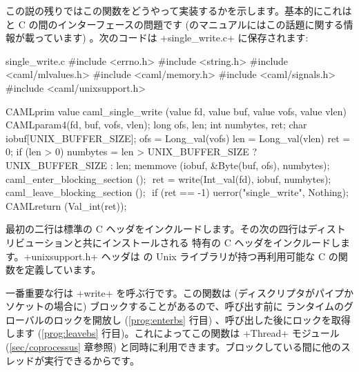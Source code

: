 この説の残りではこの関数をどうやって実装するかを示します。基本的にこれは \ocaml と C の間のインターフェースの問題です (\ocaml のマニュアルにはこの話題に関する情報が載っています) 。次のコードは \ml+single_write.c+ に保存されます:
%
\begin{listingcodefile}[style=numbers]{single_write.c}
#include <errno.h>
#include <string.h>
#include <caml/mlvalues.h>
#include <caml/memory.h>
#include <caml/signals.h>
#include <caml/unixsupport.h>

CAMLprim value caml_single_write
        (value fd, value buf, value vofs, value vlen) {
  CAMLparam4(fd, buf, vofs, vlen);
  long ofs, len;
  int numbytes, ret;
  char iobuf[UNIX_BUFFER_SIZE];
  ofs = Long_val(vofs)
  len = Long_val(vlen)
  ret = 0;
  if (len > 0) {
    numbytes = len > UNIX_BUFFER_SIZE ? UNIX_BUFFER_SIZE : len;
    memmove (iobuf, &Byte(buf, ofs), numbytes);
    caml_enter_blocking_section (); $\label{prog:enterbs}$
    ret = write(Int_val(fd), iobuf, numbytes);
    caml_leave_blocking_section (); $\label{prog:leavebs}$
    if (ret == -1) uerror("single_write", Nothing);
  }
  CAMLreturn (Val_int(ret));
}
\end{listingcodefile}
%
最初の二行は標準の C ヘッダをインクルードします。その次の四行はディストリビューションと共にインストールされる \ocaml 特有の C ヘッダをインクルードします。\ml+unixsupport.h+ ヘッダは \ocaml の Unix ライブラリが持つ再利用可能な C の関数を定義しています。

一番重要な行は \ml+write+ を呼ぶ行です。この関数は (ディスクリプタがパイプかソケットの場合に) ブロックすることがあるので、呼び出す前に \ocaml ランタイムのグローバルのロックを開放し (\ref{prog:enterbs} 行目) 、呼び出した後にロックを取得します (\ref{prog:leavebs} 行目)。これによってこの関数は \ml+Thread+ モジュール (\ref{sec/coprocessus} 章参照) と同時に利用できます。ブロックしている間に他のスレッドが実行できるからです。

